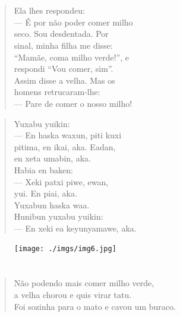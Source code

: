 \chapter*{}

\begin{verse}
Ela lhes respondeu:\\
— É por não poder comer milho\\
seco. Sou desdentada. Por\\
sinal, minha filha me disse:\\
“Mamãe, coma milho verde!”, e\\
respondi “Vou comer, sim”.\\
Assim disse a velha. Mas os\\
homens retrucaram-lhe:\\
— Pare de comer o nosso milho!
\end{verse}

\begin{verse}
Yuxabu yuikin:\\
— En haska waxun, piti kuxi\\
pitima, en ikai, aka. Eadan,\\
en xeta umabin, aka.\\
Habia en baken:\\
— Xeki patxi piwe, ewan,\\
yui. En piai, aka.\\
Yuxabun haska waa.\\
Hunibun yuxabu yuikin:\\
— En xeki ea keyunyamawe, aka.
\end{verse}

\vspace*{\fill}

\pagebreak
\thispagestyle{empty}
\begin{figure}
\vspace*{-1.6cm}
\hspace*{-2.2cm}\texttt{[image: ./imgs/img6.jpg]}
\end{figure}

\chapter*{}

\mbox{}\vspace*{\fill}

\begin{verse}
Não podendo mais comer milho verde,\\
a velha chorou e quis virar tatu.\\
Foi sozinha para o mato e cavou um buraco.
\end{verse}

